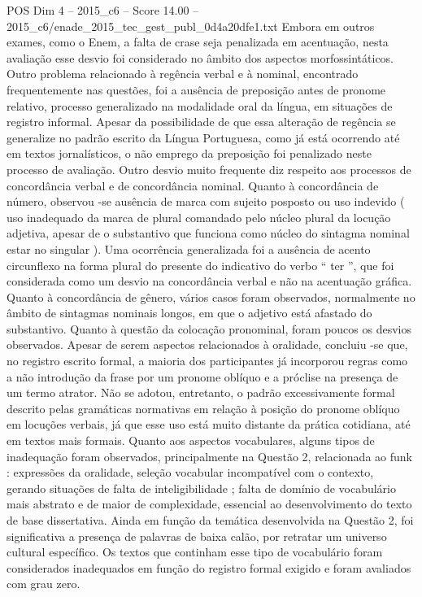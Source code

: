 \begin{textsample}{POS Dim 4 – 2015\_c6 – Score 14.00 – 2015\_c6/enade\_2015\_tec\_gest\_publ\_0d4a20dfe1.txt}
Embora em outros exames, como o Enem, a falta de crase seja penalizada em acentuação, nesta avaliação esse desvio foi considerado no âmbito dos aspectos morfossintáticos.
Outro problema relacionado à regência verbal e à nominal, encontrado frequentemente nas questões, foi a ausência de preposição antes de pronome relativo, processo generalizado na modalidade oral da língua, em situações de registro informal.
Apesar da possibilidade de que essa alteração de regência se generalize no padrão escrito da Língua Portuguesa, como já está ocorrendo até em textos jornalísticos, o não emprego da preposição foi penalizado neste processo de avaliação.
Outro desvio muito frequente diz respeito aos processos de concordância verbal e de concordância nominal.
Quanto à concordância de número, observou -se ausência de marca com sujeito posposto ou uso indevido ( uso inadequado da marca de plural comandado pelo núcleo plural da locução adjetiva, apesar de o substantivo que funciona como núcleo do sintagma nominal estar no singular ).
Uma ocorrência generalizada foi a ausência de acento circunflexo na forma plural do presente do indicativo do verbo “ ter ”, que foi considerada como um desvio na concordância verbal e não na acentuação gráfica.
Quanto à concordância de gênero, vários casos foram observados, normalmente no âmbito de sintagmas nominais longos, em que o adjetivo está afastado do substantivo.
Quanto à questão da colocação pronominal, foram poucos os desvios observados.
Apesar de serem aspectos relacionados à oralidade, concluiu -se que, no registro escrito formal, a maioria dos participantes já incorporou regras como a não introdução da frase por um pronome oblíquo e a próclise na presença de um termo atrator.
Não se adotou, entretanto, o padrão excessivamente formal descrito pelas gramáticas normativas em relação à posição do pronome oblíquo em locuções verbais, já que esse uso está muito distante da prática cotidiana, até em textos mais formais.
Quanto aos aspectos vocabulares, alguns tipos de inadequação foram observados, principalmente na Questão 2, relacionada ao funk : expressões da oralidade, seleção vocabular incompatível com o contexto, gerando situações de falta de inteligibilidade ; falta de domínio de vocabulário mais abstrato e de maior de complexidade, essencial ao desenvolvimento do texto de base dissertativa.
Ainda em função da temática desenvolvida na Questão 2, foi significativa a presença de palavras de baixa calão, por retratar um universo cultural específico.
Os textos que continham esse tipo de vocabulário foram considerados inadequados em função do registro formal exigido e foram avaliados com grau zero.

\end{textsample}
